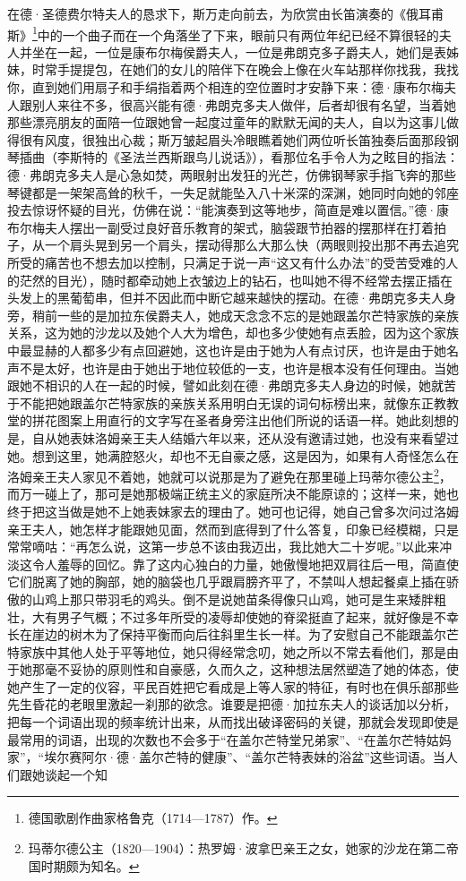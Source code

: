 \par 在德·圣德费尔特夫人的恳求下，斯万走向前去，为欣赏由长笛演奏的《俄耳甫斯》\footnote{德国歌剧作曲家格鲁克（1714—1787）作。}中的一个曲子而在一个角落坐了下来，眼前只有两位年纪已经不算很轻的夫人并坐在一起，一位是康布尔梅侯爵夫人，一位是弗朗克多子爵夫人，她们是表姊妹，时常手提提包，在她们的女儿的陪伴下在晚会上像在火车站那样你找我，我找你，直到她们用扇子和手绢指着两个相连的空位置时才安静下来：德·康布尔梅夫人跟别人来往不多，很高兴能有德·弗朗克多夫人做伴，后者却很有名望，当着她那些漂亮朋友的面陪一位跟她曾一起度过童年的默默无闻的夫人，自以为这事儿做得很有风度，很独出心裁；斯万皱起眉头冷眼瞧着她们两位听长笛独奏后面那段钢琴插曲（李斯特的《圣法兰西斯跟鸟儿说话》），看那位名手令人为之眩目的指法：德·弗朗克多夫人是心急如焚，两眼射出发狂的光芒，仿佛钢琴家手指飞奔的那些琴键都是一架架高耸的秋千，一失足就能坠入八十米深的深渊，她同时向她的邻座投去惊讶怀疑的目光，仿佛在说：“能演奏到这等地步，简直是难以置信。”德·康布尔梅夫人摆出一副受过良好音乐教育的架式，脑袋跟节拍器的摆那样在打着拍子，从一个肩头晃到另一个肩头，摆动得那么大那么快（两眼则投出那不再去追究所受的痛苦也不想去加以控制，只满足于说一声“这又有什么办法”的受苦受难的人的茫然的目光），随时都牵动她上衣皱边上的钻石，也叫她不得不经常去摆正插在头发上的黑葡萄串，但并不因此而中断它越来越快的摆动。在德·弗朗克多夫人身旁，稍前一些的是加拉东侯爵夫人，她成天念念不忘的是她跟盖尔芒特家族的亲族关系，这为她的沙龙以及她个人大为增色，却也多少使她有点丢脸，因为这个家族中最显赫的人都多少有点回避她，这也许是由于她为人有点讨厌，也许是由于她名声不是太好，也许是由于她出于地位较低的一支，也许是根本没有任何理由。当她跟她不相识的人在一起的时候，譬如此刻在德·弗朗克多夫人身边的时候，她就苦于不能把她跟盖尔芒特家族的亲族关系用明白无误的词句标榜出来，就像东正教教堂的拼花图案上用直行的文字写在圣者身旁注出他们所说的话语一样。她此刻想的是，自从她表妹洛姆亲王夫人结婚六年以来，还从没有邀请过她，也没有来看望过她。想到这里，她满腔怒火，却也不无自豪之感，这是因为，如果有人奇怪怎么在洛姆亲王夫人家见不着她，她就可以说那是为了避免在那里碰上玛蒂尔德公主\footnote{玛蒂尔德公主（1820—1904）：热罗姆·波拿巴亲王之女，她家的沙龙在第二帝国时期颇为知名。}，而万一碰上了，那可是她那极端正统主义的家庭所决不能原谅的；这样一来，她也终于把这当做是她不上她表妹家去的理由了。她可也记得，她自己曾多次问过洛姆亲王夫人，她怎样才能跟她见面，然而到底得到了什么答复，印象已经模糊，只是常常嘀咕：“再怎么说，这第一步总不该由我迈出，我比她大二十岁呢。”以此来冲淡这令人羞辱的回忆。靠了这内心独白的力量，她傲慢地把双肩往后一甩，简直使它们脱离了她的胸部，她的脑袋也几乎跟肩膀齐平了，不禁叫人想起餐桌上插在骄傲的山鸡上那只带羽毛的鸡头。倒不是说她苗条得像只山鸡，她可是生来矮胖粗壮，大有男子气概；不过多年所受的凌辱却使她的脊梁挺直了起来，就好像是不幸长在崖边的树木为了保持平衡而向后往斜里生长一样。为了安慰自己不能跟盖尔芒特家族中其他人处于平等地位，她只得经常念叨，她之所以不常去看他们，那是由于她那毫不妥协的原则性和自豪感，久而久之，这种想法居然塑造了她的体态，使她产生了一定的仪容，平民百姓把它看成是上等人家的特征，有时也在俱乐部那些先生昏花的老眼里激起一刹那的欲念。谁要是把德·加拉东夫人的谈话加以分析，把每一个词语出现的频率统计出来，从而找出破译密码的关键，那就会发现即使是最常用的词语，出现的次数也不会多于“在盖尔芒特堂兄弟家”、“在盖尔芒特姑妈家”，“埃尔赛阿尔·德·盖尔芒特的健康”、“盖尔芒特表妹的浴盆”这些词语。当人们跟她谈起一个知